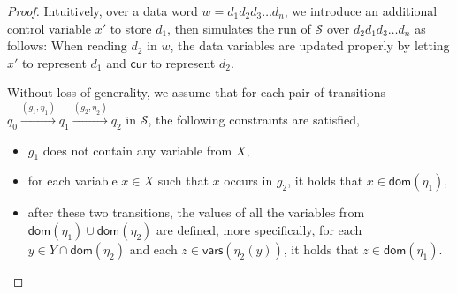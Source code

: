 \documentclass[runningheads,a4paper]{llncs}
\def\Ss{{\mathcal{S} }}
\newcommand\cur{\mathsf{cur}}
\newcommand\vars{\mathsf{vars}}
\newcommand\dom{\mathsf{dom}}
\begin{document}
\begin{appendix}
\begin{proof}
Intuitively, over a data word $w=d_1d_2 d_3 \dots d_n$, we introduce an additional control variable $x'$ to store $d_1$, then simulates the run of $\Ss$ over $d_2 d_1 d_3 \dots d_n$ as follows: When reading $d_2$ in $w$, the data variables are updated properly by letting $x'$ to represent $d_1$ and $\cur$ to represent $d_2$.

Without loss of generality, we assume that for each pair of transitions $q_0 \xrightarrow{(g_1,\eta_1)} q_1 \xrightarrow{(g_2,\eta_2)} q_2$ in $\Ss$, the following constraints are satisfied,
\begin{itemize}
\item $g_1$ does not contain any variable from $X$,
%
\item for each variable $x \in X$ such that $x$ occurs in $g_2$, it holds that $x \in \dom(\eta_1)$,
%
\item after these two transitions, the values of all the variables from $\dom(\eta_1) \cup \dom(\eta_2)$ are defined, more specifically, for each $y \in Y \cap \dom(\eta_2)$ and each $z \in \vars(\eta_2(y))$, it holds that $z \in \dom(\eta_1)$.
\end{itemize}


\end{proof}
\end{appendix}
\end{document}
